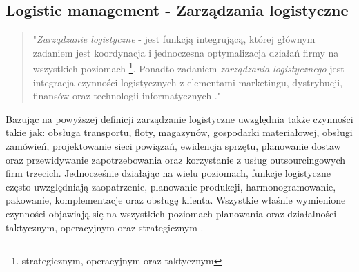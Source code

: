 	\subsection{Logistic management - Zarządzania logistyczne}
		\begin{quote}
			"\emph{Zarządzanie logistyczne} - jest funkcją integrującą, której głównym zadaniem jest
			koordynacja i jednoczesna optymalizacja działań firmy na wszystkich poziomach
			\footnote{strategicznym, operacyjnym oraz taktycznym}. Ponadto zadaniem \emph{zarządzania logistycznego} jest
			integracja czynności logistycznych z elementami marketingu, dystrybucji, finansów oraz technologii
			informatycznych \cite{csmp_logistic_management}." 
		\end{quote}
		
		Bazując na powyższej definicji zarządzanie logistyczne uwzględnia także czynności takie jak:
		obsługa transportu, floty, magazynów, gospodarki materiałowej, obsługi zamówień, 
		projektowanie sieci powiązań, ewidencja sprzętu,
		planowanie dostaw oraz przewidywanie zapotrzebowania oraz korzystanie z 
		usług outsourcingowych firm trzecich. Jednocześnie działając na wielu poziomach, 
		funkcje logistyczne często uwzględniają zaopatrzenie, planowanie produkcji, harmonogramowanie, 
		pakowanie, komplementacje oraz obsługę klienta. Wszystkie właśnie wymienione czynności
		objawiają się na wszystkich poziomach planowania oraz działalności - taktycznym, operacyjnym oraz
		strategicznym \cite{csmp_logistic_management}.

